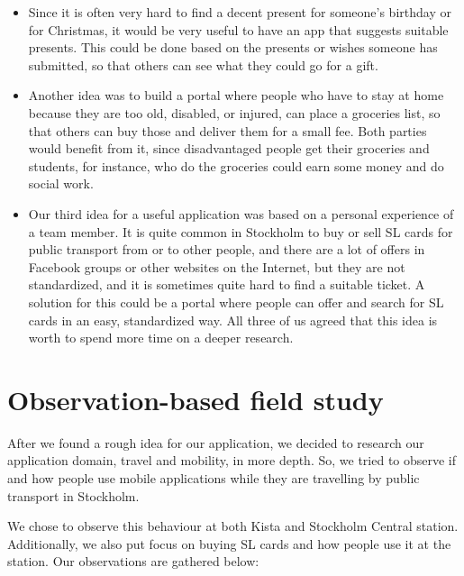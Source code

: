 \documentclass[11pt,twoside,a4paper]{report}
\begin{document}
\begin{itemize}
\item Since it is often very hard to find a decent present for someone's birthday or for Christmas, it would be very useful to have an app that suggests suitable presents. This could be done based on the presents or wishes someone has submitted, so that others can see what they could go for a gift.
\item Another idea was to build a portal where people who have to stay at home because they are too old, disabled, or injured, can place a groceries list, so that others can buy those and deliver them for a small fee. Both parties would benefit from it, since disadvantaged people get their groceries and students, for instance, who do the groceries could earn some money and do social work.
\item Our third idea for a useful application was based on a personal experience of a team member. It is quite common in Stockholm to buy or sell SL cards for public transport from or to other people, and there are a lot of offers in Facebook groups or other websites on the Internet, but they are not standardized, and it is sometimes quite hard to find a suitable ticket. A solution for this could be a portal where people can offer and search for SL cards in an easy, standardized way. All three of us agreed that this idea is worth to spend more time on a deeper research.
\end{itemize}

\section{Observation-based field study}

After we found a rough idea for our application, we decided to research our application domain, travel and mobility, in more depth. So, we tried to observe if and how people use mobile applications while they are travelling by public transport in Stockholm.

We chose to observe this behaviour at both Kista and Stockholm Central station. Additionally, we also put focus on buying SL cards and how people use it at the station. Our observations are gathered below:
\end{document}
